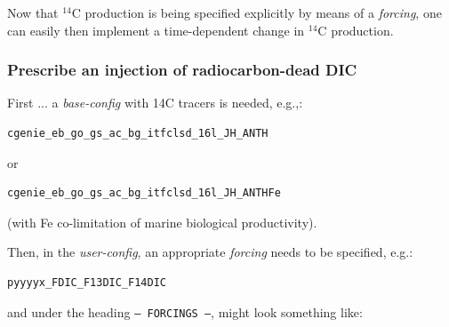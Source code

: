 \documentclass[11pt,fleqn]{book} %
\begin{document}
Now that \(^{14}\)C production is being specified explicitly by means of a \textit{forcing}, one can easily then implement a time-dependent change in \(^{14}\)C production.

%
\subsubsection{Prescribe an injection of radiocarbon-dead DIC}
\vspace{1mm}

First ... a \textit{base-config} with 14C tracers is needed, e.g.,:
\vspace{-2mm}\small\begin{verbatim}
cgenie_eb_go_gs_ac_bg_itfclsd_16l_JH_ANTH
\end{verbatim}\normalsize\vspace{-2mm}
or
\vspace{-2mm}\small\begin{verbatim}
cgenie_eb_go_gs_ac_bg_itfclsd_16l_JH_ANTHFe
\end{verbatim}\normalsize\vspace{-2mm}
(with Fe co-limitation of marine biological productivity).

Then, in the \textit{user-config}, an appropriate \textit{forcing} needs to be specified, e.g.:
\vspace{-2mm}\small\begin{verbatim}
pyyyyx_FDIC_F13DIC_F14DIC
\end{verbatim}\normalsize\vspace{-2mm}
and under the heading \texttt{--- FORCINGS ---}, might look something like:
 
\end{document}
